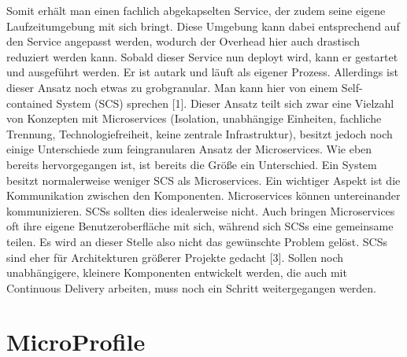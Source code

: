 Somit erhält man einen fachlich abgekapselten Service, der zudem seine eigene Laufzeitumgebung mit sich bringt. Diese Umgebung kann dabei entsprechend auf den Service angepasst werden, wodurch der Overhead hier auch drastisch reduziert werden kann. Sobald dieser Service nun deployt wird, kann er gestartet und ausgeführt werden. Er ist autark und läuft als eigener Prozess. Allerdings ist dieser Ansatz noch etwas zu grobgranular. Man kann hier von einem Self-contained System (SCS) sprechen [1]. Dieser Ansatz teilt sich zwar eine Vielzahl von Konzepten mit Microservices (Isolation, unabhängige Einheiten, fachliche Trennung, Technologiefreiheit, keine zentrale Infrastruktur), besitzt jedoch noch einige Unterschiede zum feingranularen Ansatz der Microservices. Wie eben bereits hervorgegangen ist, ist bereits die Größe ein Unterschied. Ein System besitzt normalerweise weniger SCS als Microservices. Ein wichtiger Aspekt ist die Kommunikation zwischen den Komponenten. Microservices können untereinander kommunizieren. SCSs sollten dies idealerweise nicht. Auch bringen Microservices oft ihre eigene Benutzeroberfläche mit sich, während sich SCSs eine gemeinsame teilen. Es wird an dieser Stelle also nicht das gewünschte Problem gelöst. SCSs sind eher für Architekturen größerer Projekte gedacht [3]. Sollen noch unabhängigere, kleinere Komponenten entwickelt werden, die auch mit Continuous Delivery arbeiten, muss noch ein Schritt weitergegangen werden. 

\section{MicroProfile}